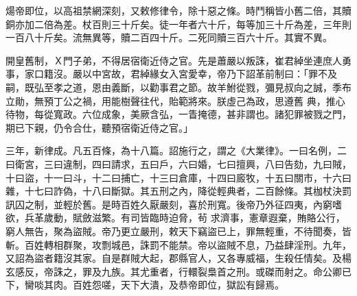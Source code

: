 \begin{pinyinscope}
 煬帝即位，以高祖禁網深刻，又敕修律令，除十惡之條。時鬥稱皆小舊二倍，其贖銅亦加二倍為差。杖百則三十斤矣。徒一年者六十斤，每等加三十斤為差，三年則一百八十斤矣。流無異等，贖二百四十斤。二死同贖三百六十斤。其實不異。



 開皇舊制，Ｘ門子弟，不得居宿衛近侍之官。先是蕭嚴以叛誅，崔君綽坐連庶人勇事，家口籍沒。嚴以中宮故，君綽緣女入宮愛幸，帝乃下詔革前制曰：「罪不及嗣，既弘至孝之道，恩由義斷，以勸事君之節。故羊鮒從戮，彌見叔向之誠，季布立勛，無預丁公之禍，用能樹聲往代，貽範將來。朕虛己為政，思遵舊
 典，推心待物，每從寬政。六位成象，美厥含弘，一眚掩德，甚非謂也。諸犯罪被戮之門，期已下親，仍令合仕，聽預宿衛近侍之官。」



 三年，新律成。凡五百條，為十八篇。詔施行之，謂之《大業律》。一曰名例，二曰衛宮，三曰違制，四曰請求，五曰戶，六曰婚，七曰擅興，八曰告劾，九曰賊，十曰盜，十一曰斗，十二曰捕亡，十三曰倉庫，十四曰廄牧，十五曰關市，十六曰雜，十七曰詐偽，十八曰斷獄。其五刑之內，降從輕典者，二百餘條。其枷杖決罰訊囚之制，並輕於舊。是時百姓久厭嚴刻，喜於刑寬。後帝乃外征四夷，內窮嗜欲，兵革歲動，賦斂滋繁。有司皆臨時迫脅，茍
 求濟事，憲章遐棄，賄賂公行，窮人無告，聚為盜賊。帝乃更立嚴刑，敕天下竊盜已上，罪無輕重，不待聞奏，皆斬。百姓轉相群聚，攻剽城邑，誅罰不能禁。帝以盜賊不息，乃益肆淫刑。九年，又詔為盜者籍沒其家。自是群賊大起，郡縣官人，又各專威福，生殺任情矣。及楊玄感反，帝誅之，罪及九族。其尤重者，行轘裂梟首之刑。或磔而射之。命公卿已下，臠啖其肉。百姓怨嗟，天下大潰，及恭帝即位，獄訟有歸焉。



\end{pinyinscope}